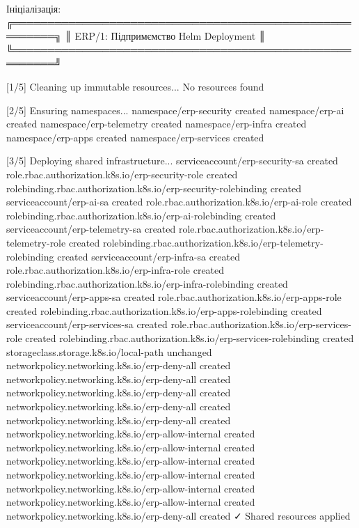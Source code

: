\documentclass[12pt,a4paper]{article}
\let\originalfootnotesize\footnotesize
\let\oldverbatim\verbatim
\let\oldendverbatim\endverbatim
\renewenvironment{verbatim}{\originalfootnotesize\oldverbatim}{\oldendverbatim}
\begin{document}
Ініціалізація:
\begin{verbatim}
╔════════════════════════════════════════════════════════╗
║    ERP/1: Підпримємство Helm Deployment                ║
╚════════════════════════════════════════════════════════╝

[1/5] Cleaning up immutable resources...
No resources found

[2/5] Ensuring namespaces...
namespace/erp-security created
namespace/erp-ai created
namespace/erp-telemetry created
namespace/erp-infra created
namespace/erp-apps created
namespace/erp-services created

[3/5] Deploying shared infrastructure...
serviceaccount/erp-security-sa created
role.rbac.authorization.k8s.io/erp-security-role created
rolebinding.rbac.authorization.k8s.io/erp-security-rolebinding created
serviceaccount/erp-ai-sa created
role.rbac.authorization.k8s.io/erp-ai-role created
rolebinding.rbac.authorization.k8s.io/erp-ai-rolebinding created
serviceaccount/erp-telemetry-sa created
role.rbac.authorization.k8s.io/erp-telemetry-role created
rolebinding.rbac.authorization.k8s.io/erp-telemetry-rolebinding created
serviceaccount/erp-infra-sa created
role.rbac.authorization.k8s.io/erp-infra-role created
rolebinding.rbac.authorization.k8s.io/erp-infra-rolebinding created
serviceaccount/erp-apps-sa created
role.rbac.authorization.k8s.io/erp-apps-role created
rolebinding.rbac.authorization.k8s.io/erp-apps-rolebinding created
serviceaccount/erp-services-sa created
role.rbac.authorization.k8s.io/erp-services-role created
rolebinding.rbac.authorization.k8s.io/erp-services-rolebinding created
storageclass.storage.k8s.io/local-path unchanged
networkpolicy.networking.k8s.io/erp-deny-all created
networkpolicy.networking.k8s.io/erp-deny-all created
networkpolicy.networking.k8s.io/erp-deny-all created
networkpolicy.networking.k8s.io/erp-deny-all created
networkpolicy.networking.k8s.io/erp-deny-all created
networkpolicy.networking.k8s.io/erp-allow-internal created
networkpolicy.networking.k8s.io/erp-allow-internal created
networkpolicy.networking.k8s.io/erp-allow-internal created
networkpolicy.networking.k8s.io/erp-allow-internal created
networkpolicy.networking.k8s.io/erp-allow-internal created
networkpolicy.networking.k8s.io/erp-allow-internal created
networkpolicy.networking.k8s.io/erp-deny-all created
    ✓ Shared resources applied


\end{verbatim}
\end{document}
